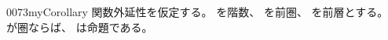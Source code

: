 \documentclass[index]{subfiles}
\begin{document}
\begin{myBlock}{0073}{myCorollary}
  関数外延性を仮定する。
  を階数、
  を前圏、
  を前層とする。
  が圏ならば、
  は命題である。\myQed
\end{myBlock}
\end{document}
